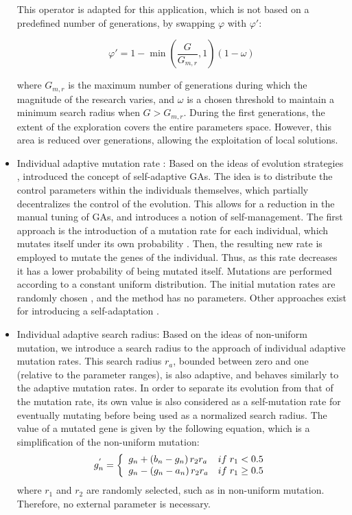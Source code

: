\documentclass{ametsoc}
\begin{document}
\begin{itemize}
	This operator is adapted for this application, which is not based on a predefined number of generations, by swapping $\varphi$ with $\varphi'$:
	
	\begin{equation}
	\varphi' = 1 - \min \left( \dfrac{G}{G_{m,r}}, 1 \right) \left(1-\omega\right)
	\end{equation}
	
	where $G_{m,r}$ is the maximum number of generations during which the magnitude of the research varies, and $\omega$ is a chosen threshold to maintain a minimum search radius when $G>G_{m,r}$. During the first generations, the extent of the exploration covers the entire parameters space. However, this area is reduced over generations, allowing the exploitation of local solutions.
	
	\item Individual adaptive mutation rate \citep{Back1992a}: Based on the ideas of evolution strategies \citep[see][]{Rechenberg1973, Schwefel1981}, \citet{Back1992a} introduced the concept of self-adaptive GAs. The idea is to distribute the control parameters within the individuals themselves, which partially decentralizes the control of the evolution. This allows for a reduction in the manual tuning of GAs, and introduces a notion of self-management. The first approach is the introduction of a mutation rate for each individual, which mutates itself under its own probability \citep{Back1992a}. Then, the resulting new rate is employed to mutate the genes of the individual. Thus, as this rate decreases it has a lower probability of being mutated itself. Mutations are performed according to a constant uniform distribution. The initial mutation rates are randomly chosen \citep{Back1992a}, and the method has no parameters. Other approaches exist for introducing a self-adaptation \citep[see][]{Smith1997a, Deb1999, Deb2001a}.
	
	\item Individual adaptive search radius: Based on the ideas of non-uniform mutation, we introduce a search radius to the approach of individual adaptive mutation rates. This search radius $r_{a}$, bounded between zero and one (relative to the parameter ranges), is also adaptive, and behaves similarly to the adaptive mutation rates. In order to separate its evolution from that of the mutation rate, its own value is also considered as a self-mutation rate for eventually mutating before being used as a normalized search radius. The value of a mutated gene is given by the following equation, which is a simplification of the non-uniform mutation:
	\begin{equation}
	g_{n}^{'} = 
	\left\lbrace \begin{array}{l l} 
	g_{n} + \left(b_{n}-g_{n}\right) r_{2} r_{a} & if \; r_{1} < 0.5 \\
	g_{n} - \left(g_{n}-a_{n}\right) r_{2} r_{a} & if \; r_{1} \geq 0.5 \\
	\end{array} \right.
	\label{eq:adaptive_search_radius_mutation}
	\end{equation}
	where $r_{1}$ and $r_{2}$ are randomly selected, such as in non-uniform mutation. Therefore, no external parameter is necessary.
	

\end{itemize}
\end{document}
